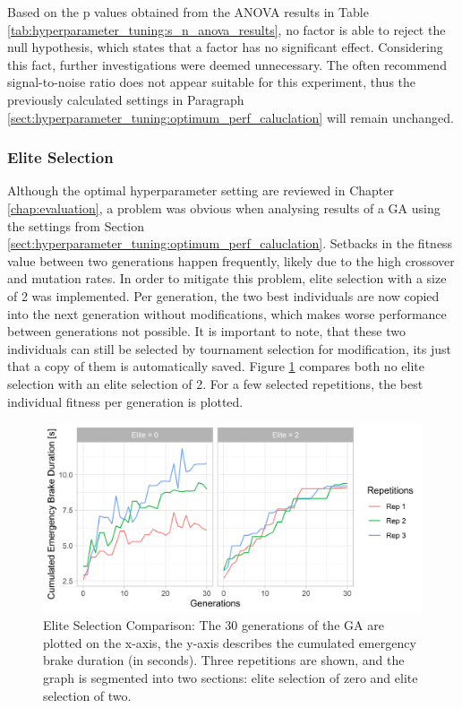Based on the p values obtained from the ANOVA results in Table \ref{tab:hyperparameter_tuning:s_n_anova_results}, no factor is able to reject the null hypothesis, which states that a factor has no significant effect. Considering this fact, further investigations were deemed unnecessary. The often recommend signal-to-noise ratio does not appear suitable for this experiment, thus the previously calculated settings in Paragraph \ref{sect:hyperparameter_tuning:optimum_perf_caluclation} will remain unchanged.

\subsubsection{Elite Selection}
Although the optimal hyperparameter setting are reviewed in Chapter \ref{chap:evaluation}, a problem was obvious when analysing results of a GA using the settings from Section \ref{sect:hyperparameter_tuning:optimum_perf_caluclation}. Setbacks in the fitness value between two generations happen frequently, likely due to the high crossover and mutation rates. In order to mitigate this problem, elite selection with a size of 2 was implemented. Per generation, the two best individuals are now copied into the next generation without modifications, which makes worse performance between generations not possible. It is important to note, that these two individuals can still be selected by tournament selection for modification, its just that a copy of them is automatically saved. Figure \ref{fig:hyperparameter_tuning:elite_no_elite_comp} compares both no elite selection with an elite selection of 2. For a few selected repetitions, the best individual fitness per generation is plotted.

\begin{figure}[ht] 
	\includegraphics[width=1\linewidth]{simulations/evaluation/plots/elite_vs_no_elite_generations}
	\caption{Elite Selection Comparison: The 30 generations of the GA are plotted on the x-axis, the y-axis describes the cumulated emergency brake duration (in seconds). Three repetitions are shown, and the graph is segmented into two sections: elite selection of zero and elite selection of two.}
	\label{fig:hyperparameter_tuning:elite_no_elite_comp}
\end{figure}

